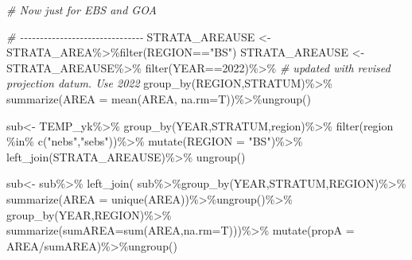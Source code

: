 \documentclass[
]{article}
\newenvironment{Shaded}{\begin{snugshade}}{\end{snugshade}}
\newcommand{\AttributeTok}[1]{\textcolor[rgb]{0.77,0.63,0.00}{#1}}
\newcommand{\CommentTok}[1]{\textcolor[rgb]{0.56,0.35,0.01}{\textit{#1}}}
\newcommand{\DecValTok}[1]{\textcolor[rgb]{0.00,0.00,0.81}{#1}}
\newcommand{\FunctionTok}[1]{\textcolor[rgb]{0.00,0.00,0.00}{#1}}
\newcommand{\NormalTok}[1]{#1}
\newcommand{\OtherTok}[1]{\textcolor[rgb]{0.56,0.35,0.01}{#1}}
\newcommand{\SpecialCharTok}[1]{\textcolor[rgb]{0.00,0.00,0.00}{#1}}
\newcommand{\StringTok}[1]{\textcolor[rgb]{0.31,0.60,0.02}{#1}}
\begin{document}
\begin{Shaded}
\begin{Highlighting}[]
  \CommentTok{\# Now just for EBS and GOA}
  
  \CommentTok{\# {-}{-}{-}{-}{-}{-}{-}{-}{-}{-}{-}{-}{-}{-}{-}{-}{-}{-}{-}{-}{-}{-}{-}{-}{-}{-}{-}{-}{-}{-}{-}}
\NormalTok{        STRATA\_AREAUSE }\OtherTok{\textless{}{-}}\NormalTok{ STRATA\_AREA}\SpecialCharTok{\%\textgreater{}\%}\FunctionTok{filter}\NormalTok{(REGION}\SpecialCharTok{==}\StringTok{"BS"}\NormalTok{)}
\NormalTok{        STRATA\_AREAUSE }\OtherTok{\textless{}{-}}\NormalTok{ STRATA\_AREAUSE}\SpecialCharTok{\%\textgreater{}\%}
          \FunctionTok{filter}\NormalTok{(YEAR}\SpecialCharTok{==}\DecValTok{2022}\NormalTok{)}\SpecialCharTok{\%\textgreater{}\%}  \CommentTok{\# updated with revised projection datum. Use 2022}
          \FunctionTok{group\_by}\NormalTok{(REGION,STRATUM)}\SpecialCharTok{\%\textgreater{}\%}
          \FunctionTok{summarize}\NormalTok{(}\AttributeTok{AREA =} \FunctionTok{mean}\NormalTok{(AREA, }\AttributeTok{na.rm=}\NormalTok{T))}\SpecialCharTok{\%\textgreater{}\%}\FunctionTok{ungroup}\NormalTok{()}
  
\NormalTok{  sub}\OtherTok{\textless{}{-}}\NormalTok{ TEMP\_yk}\SpecialCharTok{\%\textgreater{}\%}
    \FunctionTok{group\_by}\NormalTok{(YEAR,STRATUM,region)}\SpecialCharTok{\%\textgreater{}\%}
    \FunctionTok{filter}\NormalTok{(region }\SpecialCharTok{\%in\%} \FunctionTok{c}\NormalTok{(}\StringTok{"nebs"}\NormalTok{,}\StringTok{"sebs"}\NormalTok{))}\SpecialCharTok{\%\textgreater{}\%}
    \FunctionTok{mutate}\NormalTok{(}\AttributeTok{REGION =} \StringTok{"BS"}\NormalTok{)}\SpecialCharTok{\%\textgreater{}\%}
    \FunctionTok{left\_join}\NormalTok{(STRATA\_AREAUSE)}\SpecialCharTok{\%\textgreater{}\%}
    \FunctionTok{ungroup}\NormalTok{()}
  
\NormalTok{  sub}\OtherTok{\textless{}{-}}\NormalTok{ sub}\SpecialCharTok{\%\textgreater{}\%}
    \FunctionTok{left\_join}\NormalTok{(}
\NormalTok{      sub}\SpecialCharTok{\%\textgreater{}\%}\FunctionTok{group\_by}\NormalTok{(YEAR,STRATUM,REGION)}\SpecialCharTok{\%\textgreater{}\%}
        \FunctionTok{summarize}\NormalTok{(}\AttributeTok{AREA =} \FunctionTok{unique}\NormalTok{(AREA))}\SpecialCharTok{\%\textgreater{}\%}\FunctionTok{ungroup}\NormalTok{()}\SpecialCharTok{\%\textgreater{}\%}
        \FunctionTok{group\_by}\NormalTok{(YEAR,REGION)}\SpecialCharTok{\%\textgreater{}\%}
        \FunctionTok{summarize}\NormalTok{(}\AttributeTok{sumAREA=}\FunctionTok{sum}\NormalTok{(AREA,}\AttributeTok{na.rm=}\NormalTok{T)))}\SpecialCharTok{\%\textgreater{}\%}
    \FunctionTok{mutate}\NormalTok{(}\AttributeTok{propA =}\NormalTok{ AREA}\SpecialCharTok{/}\NormalTok{sumAREA)}\SpecialCharTok{\%\textgreater{}\%}\FunctionTok{ungroup}\NormalTok{()}
    

\end{Highlighting}
\end{Shaded}
\end{document}
